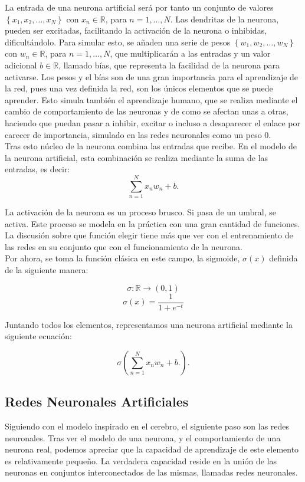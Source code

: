 La entrada de una neurona artificial será por tanto un conjunto de valores $\left\lbrace x_1,x_2,\ldots,x_N\right\rbrace$ con $x_n \in \mathbb{R}$, para $n = 1,\ldots,N$. Las dendritas de la neurona, pueden ser excitadas, facilitando la activación de la neurona o inhibidas, dificultándolo. Para simular esto, se añaden una serie de pesos $\left\lbrace w_1,w_2,\ldots,w_N\right\rbrace$ con $w_n \in \mathbb{R}$, para $n = 1,\ldots,N$, que multiplicarán a las entradas y un valor adicional $b \in \mathbb{R}$, llamado bías, que representa la facilidad de la neurona para activarse. Los pesos y el bías son de una gran importancia para el aprendizaje de la red, pues una vez definida la red, son los únicos elementos que se puede aprender. Esto simula también el aprendizaje humano, que se realiza mediante el cambio de comportamiento de las neuronas y de como se afectan unas a otras, haciendo que puedan pasar a inhibir, excitar o incluso a desaparecer el enlace por carecer de importancia, simulado en las redes neuronales como un peso 0.\\

Tras esto núcleo de la neurona combina las entradas que recibe. En el modelo de la neurona artificial, esta combinación se realiza mediante la suma de las entradas, es decir: $$\sum^N_{n=1} x_n w_n + b. $$

La activación de la neurona es un proceso brusco. Si pasa de un umbral, se activa. Este proceso se modela en la práctica con una gran cantidad de funciones. La discusión sobre que función elegir tiene más que ver con el entrenamiento de las redes en su conjunto que con el funcionamiento de la neurona.\\

Por ahora, se toma la función clásica en este campo, la sigmoide, $\sigma(x)$ definida de la siguiente manera:

$$\sigma: \mathbb{R}\longrightarrow (0,1)$$
$$\sigma(x)= \frac{1}{1+e^{-t}}$$

Juntando todos los elementos, representamos una neurona artificial mediante la siguiente ecuación:

$$\sigma \left( \sum^N_{n=1} x_n w_n + b. \right).$$

\subsection{Redes Neuronales Artificiales}

Siguiendo con el modelo inspirado en el cerebro, el siguiente paso son las redes neuronales. Tras ver el modelo de una neurona, y el comportamiento de una neurona real, podemos apreciar que la capacidad de aprendizaje de este elemento es relativamente pequeño. La verdadera capacidad reside en la unión de las neuronas en conjuntos interconectados de las mismas, llamadas redes neuronales.\\
 
